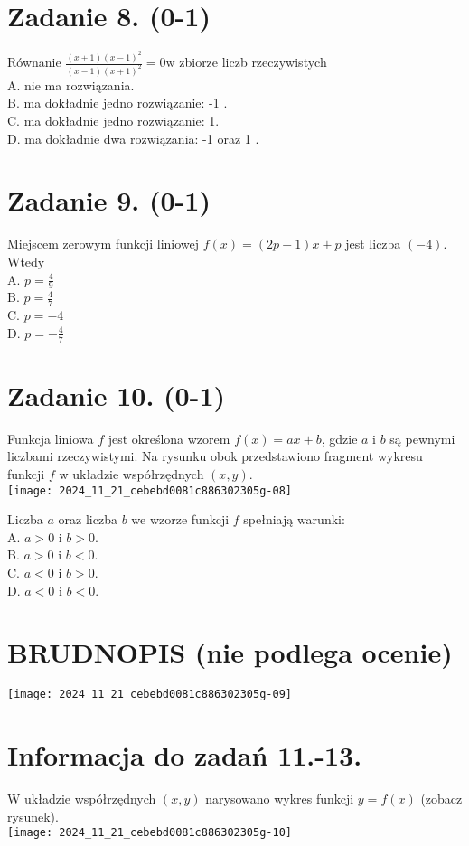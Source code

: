 \documentclass[10pt]{article}
\begin{document}
\section*{Zadanie 8. (0-1)}
Równanie \(\frac{(x+1)(x-1)^{2}}{(x-1)(x+1)^{2}}=0 \mathrm{w}\) zbiorze liczb rzeczywistych\\
A. nie ma rozwiązania.\\
B. ma dokładnie jedno rozwiązanie: -1 .\\
C. ma dokładnie jedno rozwiązanie: 1.\\
D. ma dokładnie dwa rozwiązania: -1 oraz 1 .

\section*{Zadanie 9. (0-1)}
Miejscem zerowym funkcji liniowej \(f(x)=(2 p-1) x+p\) jest liczba \((-4)\). Wtedy\\
A. \(p=\frac{4}{9}\)\\
B. \(p=\frac{4}{7}\)\\
C. \(p=-4\)\\
D. \(p=-\frac{4}{7}\)

\section*{Zadanie 10. (0-1)}
Funkcja liniowa \(f\) jest określona wzorem \(f(x)=a x+b\), gdzie \(a\) i \(b\) są pewnymi liczbami rzeczywistymi. Na rysunku obok przedstawiono fragment wykresu funkcji \(f\) w układzie współrzędnych \((x, y)\).\\
\texttt{[image: 2024\_11\_21\_cebebd0081c886302305g-08]}

Liczba \(a\) oraz liczba \(b\) we wzorze funkcji \(f\) spełniają warunki:\\
A. \(a>0\) i \(b>0\).\\
B. \(a>0\) i \(b<0\).\\
C. \(a<0\) i \(b>0\).\\
D. \(a<0\) i \(b<0\).

\section*{BRUDNOPIS (nie podlega ocenie)}
\begin{center}
\texttt{[image: 2024\_11\_21\_cebebd0081c886302305g-09]}
\end{center}

\section*{Informacja do zadań 11.-13.}
W układzie współrzędnych \((x, y)\) narysowano wykres funkcji \(y=f(x)\) (zobacz rysunek).\\
\texttt{[image: 2024\_11\_21\_cebebd0081c886302305g-10]}
\end{document}

